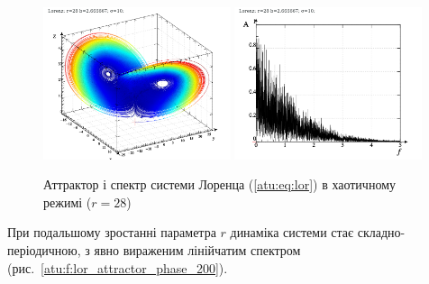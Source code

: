\begin{figure}[ht!]
\begin{center}
  \includegraphics[width=0.49\textwidth]{p/cha/lor/lor0-p_xyz_r=028.png}
  \hfill
  \includegraphics[width=0.49\textwidth]{p/cha/lor/lor0_fft-p_f_r=028.png}
\end{center}
\caption{Аттрактор і спектр системи Лоренца (\ref{atu:eq:lor}) в хаотичному режимі ($ r = 28 $)}
\label{atu:f:lor_attractor_phase_chaos28}
\end{figure}

При подальшому зростанні параметра $r$ динаміка системи стає
складно-періодичною, з явно вираженим лінійчатим спектром
(рис.~\ref{atu:f:lor_attractor_phase_200}).

